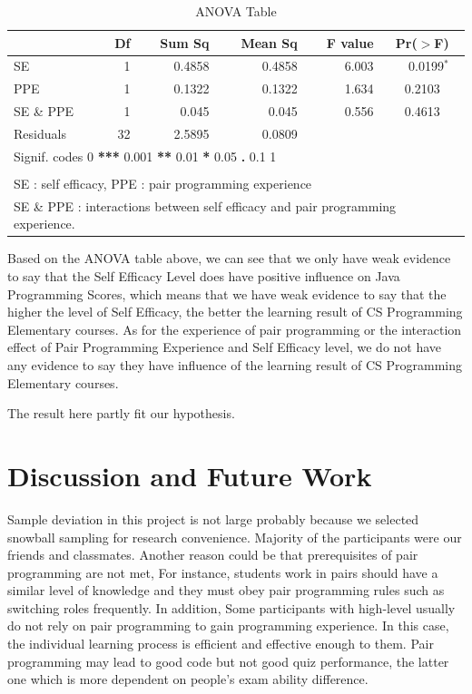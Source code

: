 \documentclass{sigchi}
\begin{document}
\begin{table}[ht]
\begin{center}
\caption{ANOVA Table}
\label{table1}
\begin{tabular}{lrrrrc}
  \hline
 & Df & Sum Sq & Mean Sq & F value & Pr($>$F) \\ 
  \hline
SE      &1	&0.4858	&0.4858	 &6.003	  &~~0.0199$^*$  \\
PPE         &1	&0.1322	&0.1322	 &1.634	  &0.2103      \\ 
 SE \& PPE          &1	&0.045	&0.045	&0.556	&0.4613  \\
  Residuals  	&32	&2.5895 & 0.0809 &  &  \\ 
   \hline
   \hline
\multicolumn{6}{l}{Signif. codes    0 \textbf{ *** } 0.001 \textbf{ ** } 0.01\textbf{ * } 0.05 \textbf{ . } 0.1 \textbf{   } 1} \\ 
\hline \\
\multicolumn{6}{l}{\small SE : self efficacy, PPE :  pair programming experience} \\
\multicolumn{6}{l}{\small SE \& PPE  : interactions between self efficacy and pair programming experience.}
\end{tabular}
\end{center}
\end{table}

Based on the ANOVA table above, we can see that we only have weak evidence to say that the Self Efficacy Level does have positive influence on Java Programming Scores, which means that we have weak evidence to say that the higher the level of Self Efficacy, the better the learning result of CS Programming Elementary courses. As for the experience of pair programming or the interaction effect of Pair Programming Experience and Self Efficacy level, we do not have any evidence to say they have influence of the learning result of CS Programming Elementary courses.

The result here partly fit our hypothesis. 


\section{Discussion and Future Work}

Sample deviation in this project is not large probably because we selected snowball sampling for research convenience.  Majority of the participants were our friends and classmates. Another reason could be that prerequisites of pair programming are not met, For instance, students work in pairs should have a similar level of knowledge and they must obey pair programming rules such as switching roles frequently. In addition, Some participants with high-level usually do not rely on pair programming to gain programming experience. In this case, the individual learning process is efficient and effective enough to them. Pair programming may lead to good code but not good quiz performance, the latter one which is more dependent on people's exam ability difference.
\end{document}

